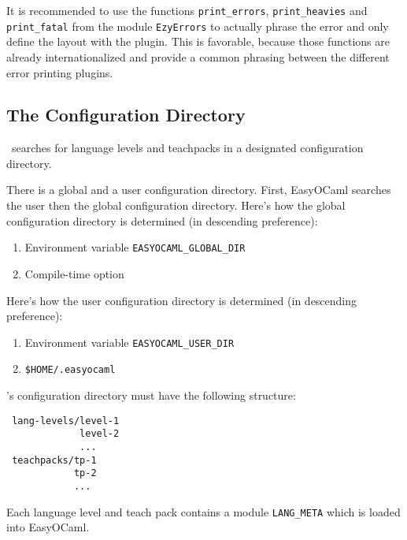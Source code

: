 It is recommended to use the functions \texttt{print\_errors},
\texttt{print\_heavies} and \texttt{print\_fatal} from the module \texttt{EzyErrors}
to actually phrase the error and only define the layout with the plugin. This is
favorable, because those functions are already internationalized and provide a
common phrasing between the different error printing plugins.

\subsection{The Configuration Directory}
\label{sec:directory}

\easyocaml\ searches for language levels and teachpacks in a designated
configuration directory.

There is a global and a user configuration directory. First, EasyOCaml 
searches the user then the global configuration directory.  Here's how 
the global configuration directory is determined (in descending 
preference):

\begin{enumerate}
    \item Environment variable \texttt{EASYOCAML\_GLOBAL\_DIR}
    \item Compile-time option
\end{enumerate}

Here's how the user configuration directory is determined (in descending 
preference):

\begin{enumerate}
    \item Environment variable \texttt{EASYOCAML\_USER\_DIR}
    \item \texttt{\$HOME/.easyocaml}
\end{enumerate}

\easyocaml's configuration directory must have the following structure:

\begin{verbatim}
 lang-levels/level-1
             level-2
             ...
 teachpacks/tp-1
            tp-2
            ...
\end{verbatim}

Each language level and teach pack contains a module \texttt{LANG\_META} 
which is loaded into EasyOCaml.

